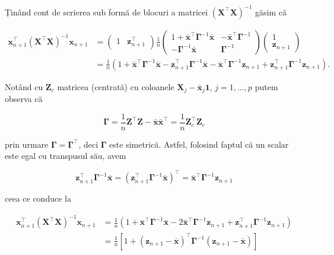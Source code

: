 \documentclass[]{article}
\begin{document}
Ținând cont de scrierea sub formă de blocuri a matricei
\(\left(\boldsymbol X^\intercal \boldsymbol X\right)^{-1}\) găsim că

\begin{align*}
\boldsymbol x_{n+1}^\intercal(\boldsymbol X^\intercal \boldsymbol X)^{-1}\boldsymbol x_{n+1} &= \begin{pmatrix}1 & \boldsymbol z_{n+1}^\intercal\end{pmatrix} \frac{1}{n}\begin{pmatrix}1 + \bar{\boldsymbol x}^\intercal\boldsymbol \Gamma^{-1}\bar{\boldsymbol x} & -\bar{\boldsymbol x}^\intercal\boldsymbol \Gamma^{-1}\\ -\boldsymbol \Gamma^{-1}\bar{\boldsymbol x} & \boldsymbol \Gamma^{-1}\end{pmatrix} \begin{pmatrix}1\\ \boldsymbol z_{n+1}\end{pmatrix} \\
&= \frac{1}{n}\left(1 + \bar{\boldsymbol x}^\intercal\boldsymbol\Gamma^{-1}\bar{\boldsymbol x} - \boldsymbol z_{n+1}^\intercal \boldsymbol\Gamma^{-1}\bar{\boldsymbol x} - \bar{\boldsymbol x}^\intercal\boldsymbol\Gamma^{-1}\boldsymbol z_{n+1} + \boldsymbol z_{n+1}^\intercal\boldsymbol\Gamma^{-1}\boldsymbol z_{n+1}\right).  
\end{align*}

Notând cu \(\boldsymbol Z_c\) matricea (centrată) cu coloanele
\(\boldsymbol X_j - \bar{\boldsymbol x}_j\mathbf{1}\),
\(j = 1,\ldots,p\) putem observa că

\[
  \boldsymbol \Gamma = \frac{1}{n}\boldsymbol Z^\intercal\boldsymbol Z - \bar{\boldsymbol x}\bar{\boldsymbol x}^\intercal = \frac{1}{n}\boldsymbol Z_c^\intercal\boldsymbol Z_c
\]

prin urmare \(\boldsymbol \Gamma = \boldsymbol \Gamma^\intercal\), deci
\(\boldsymbol \Gamma\) este simetrică. Astfel, folosind faptul că un
scalar este egal cu transpusul său, avem

\[
\boldsymbol z_{n+1}^\intercal \boldsymbol\Gamma^{-1}\bar{\boldsymbol x} = \left(\boldsymbol z_{n+1}^\intercal \boldsymbol\Gamma^{-1}\bar{\boldsymbol x}\right)^\intercal = \bar{\boldsymbol x}^\intercal\boldsymbol\Gamma^{-1}\boldsymbol z_{n+1}
\]

ceea ce conduce la

\begin{align*}
\boldsymbol x_{n+1}^\intercal(\boldsymbol X^\intercal \boldsymbol X)^{-1}\boldsymbol x_{n+1} &= \frac{1}{n}\left(1 + \bar{\boldsymbol x}^\intercal\boldsymbol\Gamma^{-1}\bar{\boldsymbol x} - 2\bar{\boldsymbol x}^\intercal\boldsymbol\Gamma^{-1}\boldsymbol z_{n+1} + \boldsymbol z_{n+1}^\intercal\boldsymbol\Gamma^{-1}\boldsymbol z_{n+1}\right) \\
&= \frac{1}{n}\left[1 + (\boldsymbol z_{n+1} - \bar{\boldsymbol x})^\intercal \boldsymbol \Gamma^{-1}(\boldsymbol z_{n+1} - \bar{\boldsymbol x})\right]
\end{align*}
\end{document}
